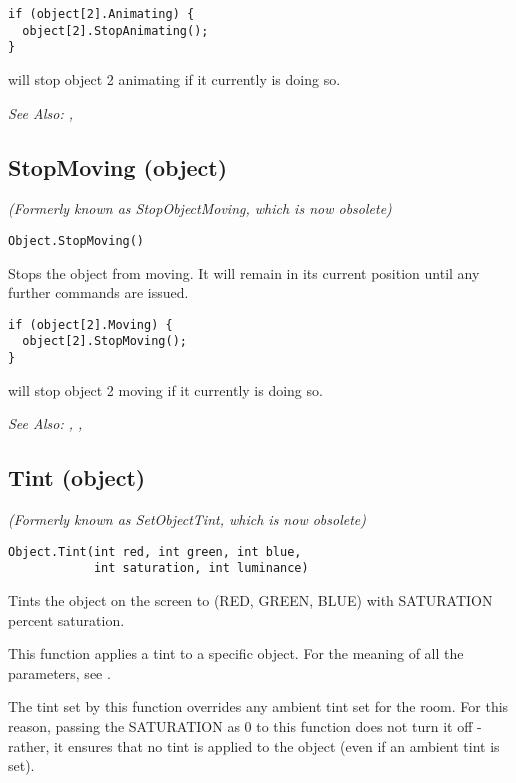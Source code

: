 \begin{verbatim}
if (object[2].Animating) {
  object[2].StopAnimating();
}
\end{verbatim}
will stop object 2 animating if it currently is doing so.

\it{See Also:} ,


\subsection{StopMoving (object)}\label{Object.StopMoving}%

\it{(Formerly known as StopObjectMoving, which is now obsolete)}

\begin{verbatim}
Object.StopMoving()
\end{verbatim}
Stops the object from moving. It will remain in its current position
until any further commands are issued.

\begin{verbatim}
if (object[2].Moving) {
  object[2].StopMoving();
}
\end{verbatim}
will stop object 2 moving if it currently is doing so.

\it{See Also:} , ,


\subsection{Tint (object)}\label{Object.Tint}%

\it{(Formerly known as SetObjectTint, which is now obsolete)}

\begin{verbatim}
Object.Tint(int red, int green, int blue,
            int saturation, int luminance)
\end{verbatim}

Tints the object on the screen to (RED, GREEN, BLUE) with SATURATION percent
saturation.

This function applies a tint to a specific object. For the meaning of all the parameters,
see .

The tint set by this function overrides any ambient tint set for the room. For this
reason, passing the SATURATION as 0 to this function does not turn it off - rather, it
ensures that no tint is applied to the object (even if an ambient tint is set).

